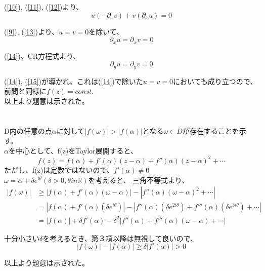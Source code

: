 \documentclass[dvipdfmx,a4paper]{jsarticle}
\begin{document}
(\ref{10}), (\ref{11}), (\ref{12})より、
\begin{equation}
\label{13}
u(-\partial_x v) + v(\partial_x u) = 0
\end{equation}

(\ref{9}), (\ref{13})より、$u=v =0$を除いて、
\begin{equation}
\label{14}
\partial_x u = \partial_x v = 0
\end{equation}

(\ref{14})、CR方程式より、
\begin{equation}
\label{15}
\partial_y u = \partial_y v = 0
\end{equation}

(\ref{14}), (\ref{15})が導かれ、これは(\ref{14})で除いた$u=v =0$においても成り立つので、\\
前問と同様に$f(z) = const.$\\
以上より題意は示された。\\


\section{}
D内の任意の点$\alpha$に対して$|f(\omega)| > |f(\alpha)|$となる$\omega \in D$が存在することを示す。\\
$\alpha$を中心として、f(z)をTaylor展開すると、
$$
f(z) = f(\alpha) + f'(\alpha)(z-\alpha) + f''(\alpha)(z-\alpha)^2 + \cdots
$$
ただし、f(z)は定数ではないので、$f'(\alpha) \neq 0$\\
$\omega = \alpha + \delta e^{i\theta}(\delta > 0,  \theta in \mathbb{R})$を考えると、
三角不等式より、
\begin{align*}
|f(\omega)| &\geq |f(\alpha) + f'(\alpha) (\omega -\alpha)| - |f''(\alpha)(\omega - \alpha)^2 + \cdots |\\
&= |f(\alpha) + f'(\alpha) (\delta e^{i\theta})| - |f''(\alpha)(\delta e^{2i\theta}) + f'''(\alpha)(\delta e^{3i\theta}) + \cdots |\\
&= |f(\alpha)| + \delta f'(\alpha) - \delta ^2 |f''(\alpha) + f'''(\alpha)(\omega - \alpha) + \cdots |
\end{align*}

十分小さい$\delta$を考えるとき、第３項以降は無視して良いので、
$$
|f(\omega)| - |f(\alpha)| \geq \delta |f'(\alpha)| > 0
$$

以上より題意は示された。\\


\section{}
\end{document}
